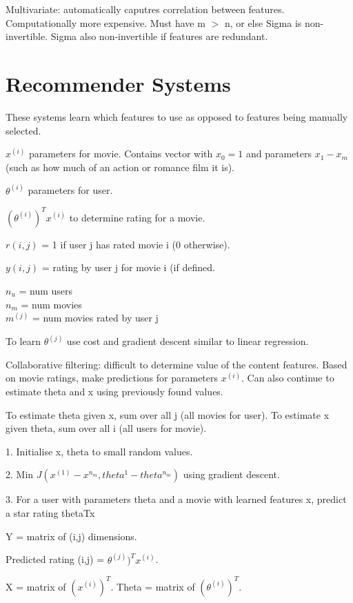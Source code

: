 \documentclass[12pt, a4paper]{article}
\begin{document}
{  Multivariate: automatically caputres correlation between features.
  Computationally more expensive. Must have m $>$ n, or else Sigma is 
  non-invertible. Sigma also non-invertible if features are redundant. 
  
  \newpage
  
\section{Recommender Systems}

  These systems learn which features to use as opposed to features being 
  manually selected. 
  
  $x^{(i)}$ parameters for movie. Contains vector with $x_0=1$ and parameters 
  $x_1-x_m$ (such as how much of an action or romance film it is). 

  $\theta^{(i)}$ parameters for user.
  
  $(\theta^{(i)})^T x^{(i)}$ to determine rating for a movie. 
  
  $r(i,j)$ = 1 if user j has rated movie i (0 otherwise).
  
  $y(i,j)$ = rating by user j for movie i (if defined.
  
  $n_u$ = num users\\
  $n_m$ = num movies\\
  $m^{(j)}$ = num movies rated by user j

  To learn $\theta^{(j)}$ use cost and gradient descent similar to linear 
  regression.

  Collaborative filtering: difficult to determine value of the content
  features. Based on movie ratings, make predictions for parameters $x^{(i)}$. 
  Can also continue to estimate theta and x using previously found values. 
  
  To estimate theta given x, sum over all j (all movies for user). To estimate
  x given theta, sum over all i (all users for movie).

  1. Initialise x, theta to small random values.

  2. Min $J(x^{(1)}-x^{n_m},theta^{1}-theta^{n_m})$ using gradient descent.

  3. For a user with parameters theta and a movie with learned features x, 
  predict a star rating thetaTx

  Y = matrix of (i,j) dimensions.

  Predicted rating (i,j) = $\theta^{(j)})^T x^{(i)}$.

  X = matrix of $(x^{(i)})^T$. Theta = matrix of $(\theta^{(i)})^T$. 

}
\end{document}
